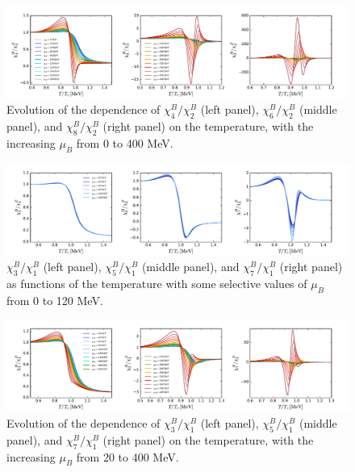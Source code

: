 \documentclass[%
reprint,
superscriptaddress,
showpacs,preprintnumbers,
 amsmath,amssymb,
 aps,
prd,
]{revtex4-1}
\begin{document}
%
\begin{figure}[t]
\includegraphics[width=1\textwidth]{R42R62R82-T-muB0to400}
\caption{Evolution of the dependence of $\chi^{B}_{4}/\chi^{B}_{2}$ (left panel), $\chi^{B}_{6}/\chi^{B}_{2}$ (middle panel), and $\chi^{B}_{8}/\chi^{B}_{2}$ (right panel) on the temperature, with the increasing $\mu_B$ from 0 to 400 MeV.}\label{fig:R42R62R82-T-muB0to400}
\end{figure}
%

%
\begin{figure}[t]
\includegraphics[width=1\textwidth]{R31R51R71-T-muB0to120}
\caption{$\chi^{B}_{3}/\chi^{B}_{1}$ (left panel), $\chi^{B}_{5}/\chi^{B}_{1}$ (middle panel), and $\chi^{B}_{7}/\chi^{B}_{1}$ (right panel) as functions of the temperature with some selective values of $\mu_B$ from 0 to 120 MeV.}\label{fig:R31R51R71-T-muB0to120}
\end{figure}
%

%
\begin{figure}[t]
\includegraphics[width=1\textwidth]{R31R51R71-T-muB0to400}
\caption{Evolution of the dependence of $\chi^{B}_{3}/\chi^{B}_{1}$ (left panel), $\chi^{B}_{5}/\chi^{B}_{1}$ (middle panel), and $\chi^{B}_{7}/\chi^{B}_{1}$ (right panel) on the temperature, with the increasing $\mu_B$ from 20 to 400 MeV.}\label{fig:R31R51R71-T-muB0to400}
\end{figure}
%
\end{document}
